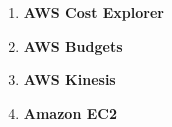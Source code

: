 \documentclass{article}
\begin{document}
\begin{enumerate}
    \item \textbf{AWS Cost Explorer} \cite{costexplore}
    \item \textbf{AWS Budgets} \cite{budgets}
    \item \textbf{AWS Kinesis} \cite{kinesis}
    \item \textbf{Amazon EC2} \cite{ec2}

\end{enumerate}
\end{document}
